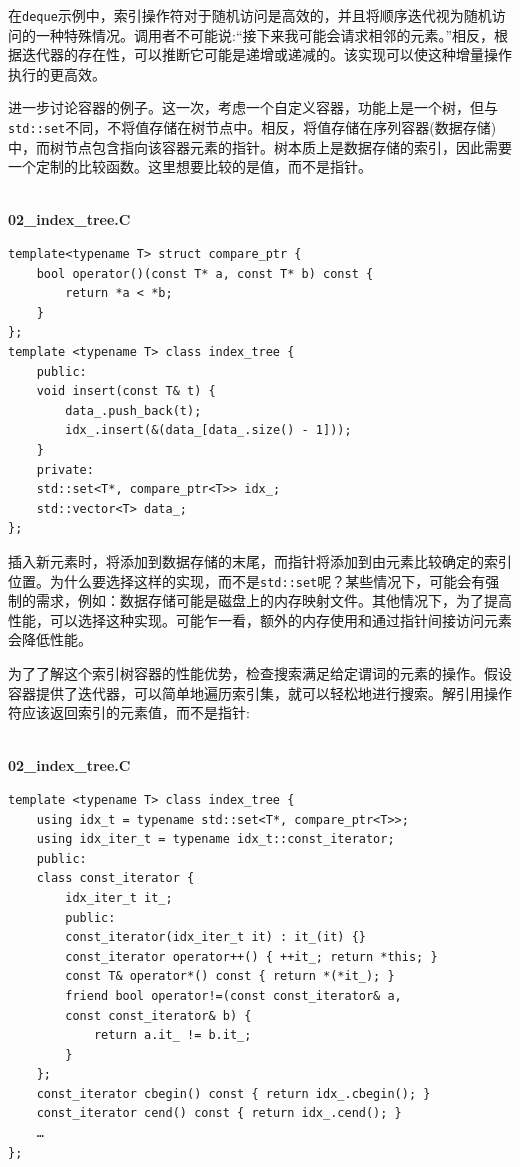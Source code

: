 在\texttt{deque}示例中，索引操作符对于随机访问是高效的，并且将顺序迭代视为随机访问的一种特殊情况。调用者不可能说:“接下来我可能会请求相邻的元素。”相反，根据迭代器的存在性，可以推断它可能是递增或递减的。该实现可以使这种增量操作执行的更高效。

进一步讨论容器的例子。这一次，考虑一个自定义容器，功能上是一个树，但与\texttt{std::set}不同，不将值存储在树节点中。相反，将值存储在序列容器(数据存储)中，而树节点包含指向该容器元素的指针。树本质上是数据存储的索引，因此需要一个定制的比较函数。这里想要比较的是值，而不是指针。

\hspace*{\fill} \\ %
\noindent
\textbf{02\_index\_tree.C}
\begin{lstlisting}[style=styleCXX]
template<typename T> struct compare_ptr {
	bool operator()(const T* a, const T* b) const {
		return *a < *b;
	}
};
template <typename T> class index_tree {
	public:
	void insert(const T& t) { 
		data_.push_back(t);
		idx_.insert(&(data_[data_.size() - 1]));
	}
	private:
	std::set<T*, compare_ptr<T>> idx_;
	std::vector<T> data_;
};
\end{lstlisting}

插入新元素时，将添加到数据存储的末尾，而指针将添加到由元素比较确定的索引位置。为什么要选择这样的实现，而不是\texttt{std::set}呢？某些情况下，可能会有强制的需求，例如：数据存储可能是磁盘上的内存映射文件。其他情况下，为了提高性能，可以选择这种实现。可能乍一看，额外的内存使用和通过指针间接访问元素会降低性能。 

为了了解这个索引树容器的性能优势，检查搜索满足给定谓词的元素的操作。假设容器提供了迭代器，可以简单地遍历索引集，就可以轻松地进行搜索。解引用操作符应该返回索引的元素值，而不是指针:

\hspace*{\fill} \\ %
\noindent
\textbf{02\_index\_tree.C}
\begin{lstlisting}[style=styleCXX]
template <typename T> class index_tree {
	using idx_t = typename std::set<T*, compare_ptr<T>>;
	using idx_iter_t = typename idx_t::const_iterator;
	public:
	class const_iterator {
		idx_iter_t it_;
		public:
		const_iterator(idx_iter_t it) : it_(it) {}
		const_iterator operator++() { ++it_; return *this; }
		const T& operator*() const { return *(*it_); }
		friend bool operator!=(const const_iterator& a,
		const const_iterator& b) {
			return a.it_ != b.it_;
		}
	};
	const_iterator cbegin() const { return idx_.cbegin(); }
	const_iterator cend() const { return idx_.cend(); }
	…
};
\end{lstlisting}

